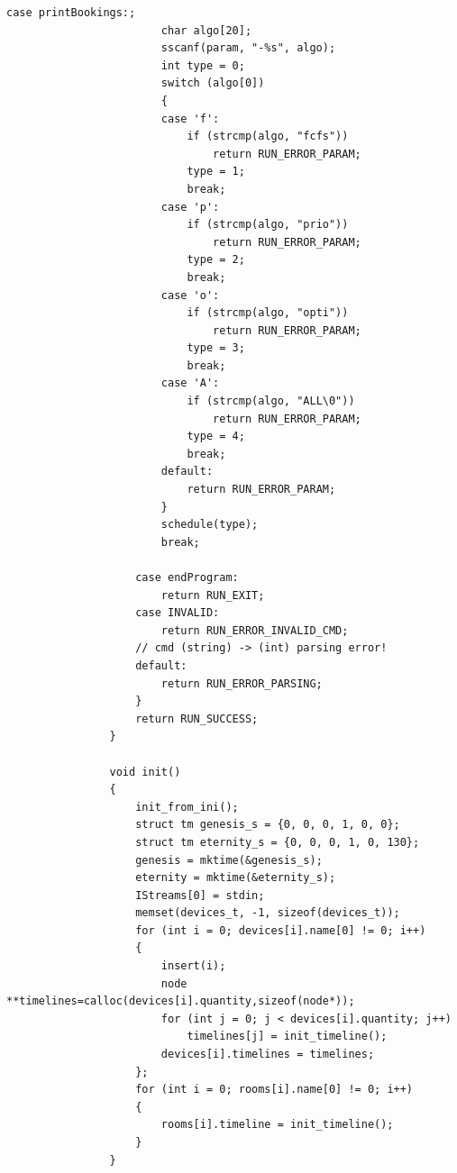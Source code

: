 \documentclass{article}
\begin{document}
\begin{Verbatim}[gobble=8]
                    case printBookings:;
                        char algo[20];
                        sscanf(param, "-%s", algo);
                        int type = 0;
                        switch (algo[0])
                        {
                        case 'f':
                            if (strcmp(algo, "fcfs"))
                                return RUN_ERROR_PARAM;
                            type = 1;
                            break;
                        case 'p':
                            if (strcmp(algo, "prio"))
                                return RUN_ERROR_PARAM;
                            type = 2;
                            break;
                        case 'o':
                            if (strcmp(algo, "opti"))
                                return RUN_ERROR_PARAM;
                            type = 3;
                            break;
                        case 'A':
                            if (strcmp(algo, "ALL\0"))
                                return RUN_ERROR_PARAM;
                            type = 4;
                            break;
                        default:
                            return RUN_ERROR_PARAM;
                        }
                        schedule(type);
                        break;
                
                    case endProgram:
                        return RUN_EXIT;
                    case INVALID:
                        return RUN_ERROR_INVALID_CMD;
                    // cmd (string) -> (int) parsing error!
                    default:
                        return RUN_ERROR_PARSING;
                    }
                    return RUN_SUCCESS;
                }
                
                void init()
                {
                    init_from_ini();
                    struct tm genesis_s = {0, 0, 0, 1, 0, 0};
                    struct tm eternity_s = {0, 0, 0, 1, 0, 130};
                    genesis = mktime(&genesis_s);
                    eternity = mktime(&eternity_s);
                    IStreams[0] = stdin;
                    memset(devices_t, -1, sizeof(devices_t));
                    for (int i = 0; devices[i].name[0] != 0; i++)
                    {
                        insert(i);
                        node **timelines=calloc(devices[i].quantity,sizeof(node*));
                        for (int j = 0; j < devices[i].quantity; j++)
                            timelines[j] = init_timeline();
                        devices[i].timelines = timelines;
                    };
                    for (int i = 0; rooms[i].name[0] != 0; i++)
                    {
                        rooms[i].timeline = init_timeline();
                    }
                }
                

\end{Verbatim}
\end{document}
